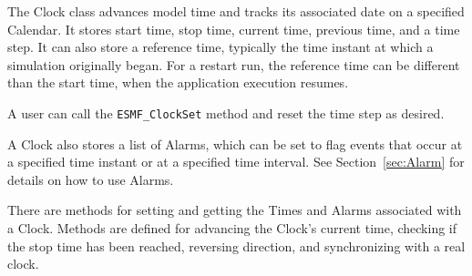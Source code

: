 
\label{sec:Clock}

The Clock class advances model time and tracks its associated
date on a specified Calendar.  It stores start time, stop time,
current time, previous time, and a time step.  It can also store
a reference time, typically the time instant at which a simulation 
originally began.  For a restart run, the reference time can be 
different than the start time, when the application execution resumes.

A user can call the {\tt ESMF\_ClockSet} method and reset the time 
step as desired.  

A Clock also stores a list of Alarms, which can be set to flag 
events that occur at a specified time instant or at 
a specified time interval.  See Section~\ref{sec:Alarm} for 
details on how to use Alarms.

There are methods for setting and getting the Times and 
Alarms associated with a Clock.  Methods are defined for 
advancing the Clock's current time, checking if the 
stop time has been reached, reversing direction, and 
synchronizing with a real clock. 


